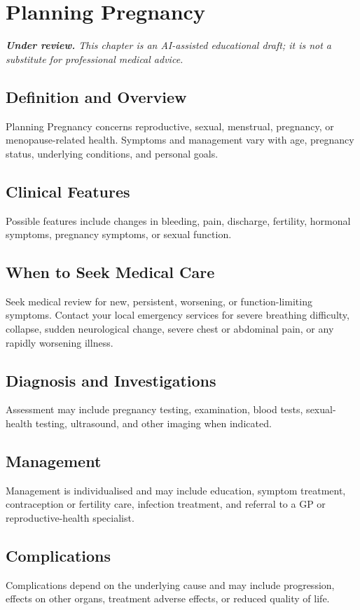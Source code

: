 \chapter{Planning Pregnancy}

\medskip
\noindent\textit{\textbf{Under review.} This chapter is an AI-assisted educational draft; it is not a substitute for professional medical advice.}

\section*{Definition and Overview}
Planning Pregnancy concerns reproductive, sexual, menstrual, pregnancy, or menopause-related health. Symptoms and management vary with age, pregnancy status, underlying conditions, and personal goals.

\section*{Clinical Features}
Possible features include changes in bleeding, pain, discharge, fertility, hormonal symptoms, pregnancy symptoms, or sexual function.

\section*{When to Seek Medical Care}
Seek medical review for new, persistent, worsening, or function-limiting symptoms. Contact your local emergency services for severe breathing difficulty, collapse, sudden neurological change, severe chest or abdominal pain, or any rapidly worsening illness.

\section*{Diagnosis and Investigations}
Assessment may include pregnancy testing, examination, blood tests, sexual-health testing, ultrasound, and other imaging when indicated.

\section*{Management}
Management is individualised and may include education, symptom treatment, contraception or fertility care, infection treatment, and referral to a GP or reproductive-health specialist.

\section*{Complications}
Complications depend on the underlying cause and may include progression, effects on other organs, treatment adverse effects, or reduced quality of life.

